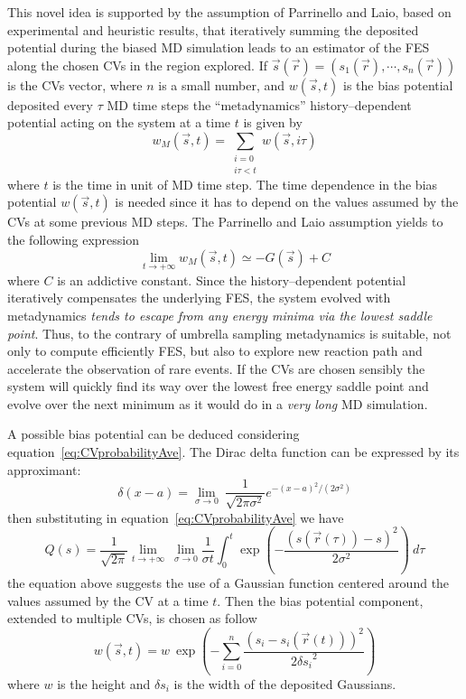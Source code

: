 This novel idea is supported by the assumption of Parrinello and Laio, based on experimental and heuristic 
results, that iteratively summing the deposited potential during the biased \ac{MD} simulation leads to
an estimator of the \ac{FES} along the chosen \acp{CV} in the region explored. If
$\vec s(\vec r) = (s_1(\vec r), \cdots, s_n(\vec r))$ is the \acp{CV} vector, where $n$ is a small number, and
$w(\vec s, t)$ is the bias potential deposited every $\tau$ \ac{MD} time steps the ``metadynamics''
history--dependent potential acting on the system at a time $t$ is given by
\begin{equation*}
	w_M(\vec s, t) = \sum_{\substack{i=0 \\ i\tau < t}} w(\vec s, i\tau)
\end{equation*}
where $t$ is the time in unit of \ac{MD} time step. The time dependence in the bias potential $w(\vec s, t)$ is
needed since it has to depend on the values assumed by the \acp{CV} at some previous \ac{MD} steps. The 
Parrinello and Laio assumption yields to the following expression
\begin{equation}
	\lim_{t\to + \infty} w_M(\vec s, t)  \simeq -G(\vec s) + C
	\label{eq:metadfes}
\end{equation}
where $C$ is an addictive constant. Since the history--dependent potential iteratively compensates the underlying
\ac{FES}, the system evolved with metadynamics \textit{tends to escape from any energy minima via the lowest
saddle point}. Thus, to the contrary of umbrella sampling metadynamics is suitable, not only to compute
efficiently \ac{FES}, but also to explore new reaction path and accelerate the observation of rare events. If the
\acp{CV} are chosen sensibly the system will quickly find its way over the lowest free energy saddle point and
evolve over the next minimum as it would do in a \textit{very long} \ac{MD} simulation.

A possible bias potential can be deduced considering equation~\eqref{eq:CVprobabilityAve}. The Dirac delta
function can be expressed by its approximant:
\begin{equation*}
	\delta(x-a) = \lim_{\sigma\to 0}\ \frac{1}{\sqrt{2 \pi \sigma^2}}e^{-(x-a)^2/(2\sigma^2)}
\end{equation*}
then substituting in equation~\eqref{eq:CVprobabilityAve} we have
\begin{equation*}
	Q(s) = \frac{1}{\sqrt{2\pi}}\lim_{t\to +\infty}\ \lim_{\sigma\to 0} \frac{1}{\sigma t}\int_0^t \exp{ \left ( -\frac{(s(\vec r(\tau))-s)^2}{2\sigma^2} \right )} \ d\tau
\end{equation*}
the equation above suggests the use of a Gaussian function centered around the values assumed by the \ac{CV} at a
time $t$. Then the bias potential component, extended to multiple \acp{CV}, is chosen as follow
\begin{equation*}
	w(\vec s, t) = w\ \exp\left ({-\sum_{i=0}^n \frac{(s_i - s_i(\vec r(t)))^2}{2{\delta s_i}^2} }\right )
\end{equation*}
where $w$ is the height and $\delta s_i$ is the width of the deposited Gaussians.


